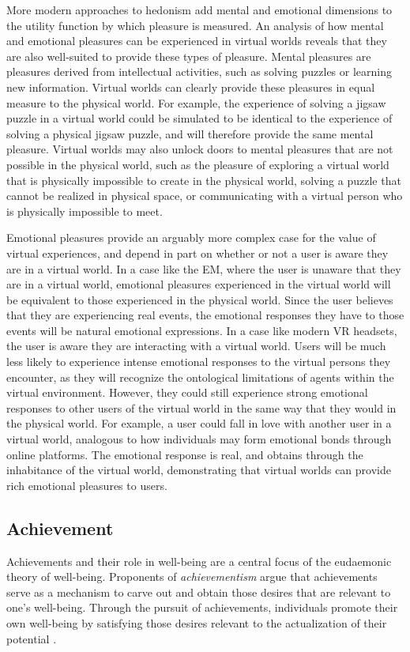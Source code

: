 More modern approaches to hedonism add mental and emotional dimensions to the 
utility function by which pleasure is measured. An analysis of how mental and 
emotional pleasures can be experienced in virtual worlds reveals that they are
also well-suited to provide these types of pleasure. Mental pleasures are 
pleasures derived from intellectual activities, such as solving puzzles or
learning new information. Virtual worlds can clearly provide these pleasures in
equal measure to the physical world. For example, the experience of solving a 
jigsaw puzzle in a virtual world could be simulated to be identical to the
experience of solving a physical jigsaw puzzle, and will therefore provide the
same mental pleasure. Virtual worlds may also unlock doors to mental pleasures
that are not possible in the physical world, such as the pleasure of exploring
a virtual world that is physically impossible to create in the physical world,
solving a puzzle that cannot be realized in physical space, or communicating 
with a virtual person who is physically impossible to meet.

Emotional pleasures provide an arguably more complex case for the value of
virtual experiences, and depend in part on whether or not a user is aware they
are in a virtual world. In a case like the EM, where the user is unaware that
they are in a virtual world, emotional pleasures experienced in the virtual
world will be equivalent to those experienced in the physical world. Since the
user believes that they are experiencing real events, the emotional responses
they have to those events will be natural emotional expressions. In a case like
modern VR headsets, the user is aware they are interacting with a virtual world.
Users will be much less likely to experience intense emotional responses to the
virtual persons they encounter, as they will recognize the ontological
limitations of agents within the virtual environment. However, they could still
experience strong emotional responses to other users of the virtual world in
the same way that they would in the physical world. For example, a user could
fall in love with another user in a virtual world, analogous to how individuals
may form emotional bonds through online platforms. The emotional response is
real, and obtains through the inhabitance of the virtual world, demonstrating
that virtual worlds can provide rich emotional pleasures to users.

\subsection{Achievement}
Achievements and their role in well-being are a central focus of the eudaemonic
theory of well-being. Proponents of \emph{achievementism} argue that
achievements serve as a mechanism to carve out and obtain those desires that are
relevant to one's well-being. Through the pursuit of achievements, individuals
promote their own well-being by satisfying those desires relevant to the
actualization of their potential \citep{Bradford2016-BRAAWA-3}.

